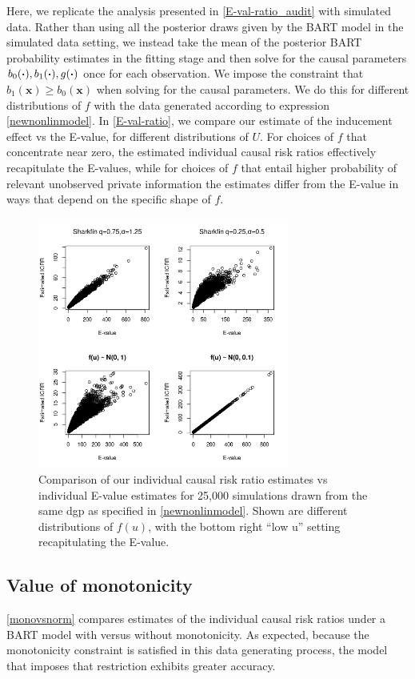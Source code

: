 \documentclass[aoas,preprint, 11pt, dvipsnames, table, x11name]{imsart}
\renewcommand{\bm}[1]{\mathbf{#1}}
\theoremstyle{remark}
\begin{document}
	
	Here, we replicate the analysis presented in \autoref{E-val-ratio_audit} with simulated data.  Rather than using all the posterior draws given by the BART model in the simulated data setting, we instead take the mean of the posterior BART probability estimates in the fitting stage and then solve for the causal parameters $b_0(\vdot), b_1(\vdot), g(\vdot)$ once for each observation.  We impose the constraint that $b_1(\bm{x})\geq b_0(\bm{x})$ when solving for the causal parameters. We do this for different distributions of $f$ with the data generated according to expression \autoref{newnonlinmodel}.   In \autoref{E-val-ratio}, we compare our estimate of the inducement effect vs the E-value, for different distributions of $U$. For choices of $f$ that concentrate near zero, the estimated individual causal risk ratios effectively recapitulate the E-values, while for choices of $f$ that entail higher probability of relevant unobserved private information the estimates differ from the E-value in ways that depend on the specific shape of $f$. 
	\begin{figure}[t]
		\centering
		
		\includegraphics[height=8.25cm]{eval_vs_our_sim}
		
		\caption[E-val vs ratio]{  Comparison of our individual causal risk ratio estimates vs individual E-value estimates for 25,000 simulations drawn from the same dgp as specified in \autoref{newnonlinmodel}.  Shown are different distributions of $f(u)$, with the bottom right ``low u'' setting recapitulating the E-value. }
		\label{E-val-ratio}
		
	\end{figure}
	
	\subsection{Value of monotonicity}\label{mono_section}
	\autoref{monovsnorm} compares estimates of the individual causal risk ratios under a BART model with versus without monotonicity. As expected, because the monotonicity constraint is satisfied in this data generating process, the model that imposes that restriction exhibits greater accuracy.
	
\end{document}
